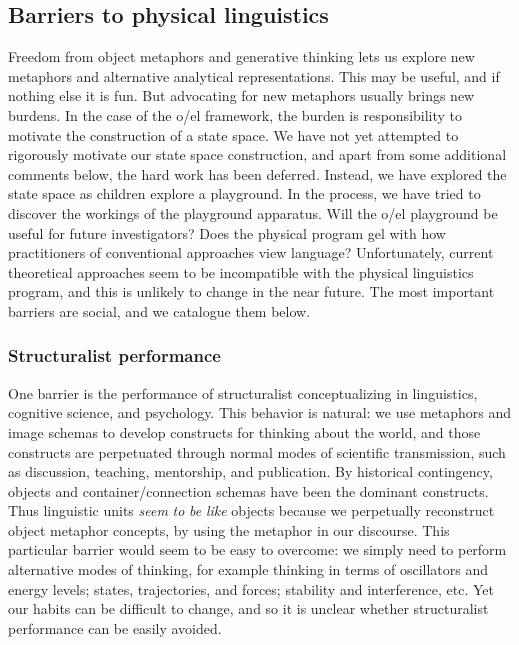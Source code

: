 \subsection{Barriers to physical linguistics}

Freedom from object metaphors and generative thinking lets us explore new metaphors and alternative analytical representations. This may be useful, and if nothing else it is fun. But advocating for new metaphors usually brings new burdens. In the case of the o/el framework, the burden is responsibility to motivate the construction of a state space. We have not yet attempted to rigorously motivate our state space construction, and apart from some additional comments below, the hard work has been deferred. Instead, we have explored the state space as children explore a playground. In the process, we have tried to discover the workings of the playground apparatus. Will the o/el playground be useful for future investigators? Does the physical program gel with how practitioners of conventional approaches view language? Unfortunately, current theoretical approaches seem to be incompatible with the physical linguistics program, and this is unlikely to change in the near future. The most important barriers are social, and we catalogue them below.

\subsubsection{Structuralist performance}

One barrier is the performance of structuralist conceptualizing in linguistics, cognitive science, and psychology. This behavior is natural: we use metaphors and image schemas to develop constructs for thinking about the world, and those constructs are perpetuated through normal modes of scientific transmission, such as discussion, teaching, mentorship, and publication. By historical contingency, objects and container/connection schemas have been the dominant constructs. Thus linguistic units \textit{seem} \textit{to} \textit{be} \textit{like} objects because we perpetually reconstruct object metaphor concepts, by using the metaphor in our discourse. This particular barrier would seem to be easy to overcome: we simply need to perform alternative modes of thinking, for example thinking in terms of oscillators and energy levels; states, trajectories, and forces; stability and interference, etc. Yet our habits can be difficult to change, and so it is unclear whether structuralist performance can be easily avoided.

